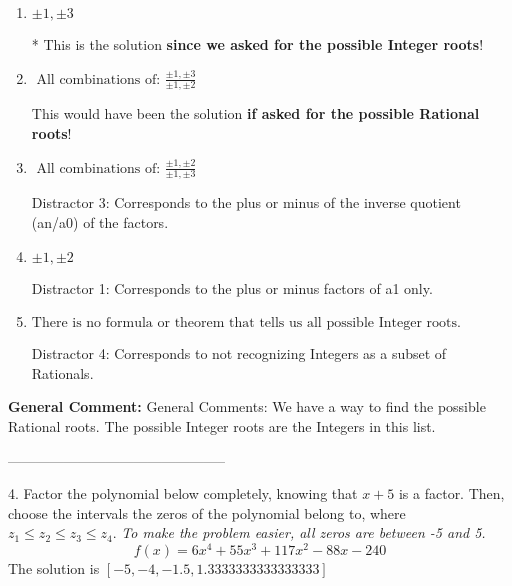 \documentclass{extbook}[14pt]
\begin{document}
\begin{enumerate}[label=\Alph*.] 
\item $ \pm 1,\pm 3 $ 

 * This is the solution \textbf{since we asked for the possible Integer roots}! 
\item $ \text{ All combinations of: }\frac{\pm 1,\pm 3}{\pm 1,\pm 2} $ 

 This would have been the solution \textbf{if asked for the possible Rational roots}! 
\item $ \text{ All combinations of: }\frac{\pm 1,\pm 2}{\pm 1,\pm 3} $ 

  Distractor 3: Corresponds to the plus or minus of the inverse quotient (an/a0) of the factors.  
\item $ \pm 1,\pm 2 $ 

  Distractor 1: Corresponds to the plus or minus factors of a1 only. 
\item $ \text{There is no formula or theorem that tells us all possible Integer roots.} $ 

  Distractor 4: Corresponds to not recognizing Integers as a subset of Rationals. 
\end{enumerate} 
 
\textbf{General Comment:} General Comments: We have a way to find the possible Rational roots. The possible Integer roots are the Integers in this list. 

-----------------------------------------------

4. Factor the polynomial below completely, knowing that $x+5$ is a factor. Then, choose the intervals the zeros of the polynomial belong to, where $z_1 \leq z_2 \leq z_3 \leq z_4$. \textit{To make the problem easier, all zeros are between -5 and 5.}
\[ f(x) = 6x^{4} +55 x^{3} +117 x^{2} -88 x -240 \] 
The solution is $ [-5, -4, -1.5, 1.3333333333333333] $ 
\end{document}
